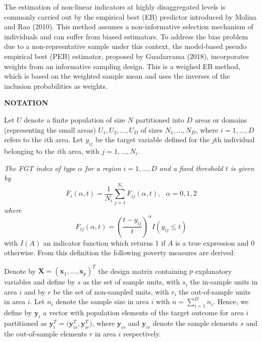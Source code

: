\documentclass[a4paper, 11pt]{article}
\begin{document}
The estimation of non-linear indicators at highly disaggregated levels is commonly carried out by the empirical best (EB) predictor introduced by Molina and Rao (2010). This method assumes a non-informative selection mechanism of individuals and can suffer from biased estimators. To address the bias problem due to a non-represntative sample under this context, the model-based pseudo empirical best (PEB) estimator, proposed by Guadarrama (2018), incorporates weights from an informative sampling design. This is a weighed EB method, which is based on the weighted sample mean and uses the inverses of the inclusion probabilities as weights.  

\textbf{NOTATION}

Let $U$ denote a finite population of size $N$ partitioned into $D$ areas or domains (representing the small areas) $U_1,U_2,\ldots,U_D$ of sizes $N_1,\ldots, N_D$, where $i=1,\ldots,D$ refers to the $i$th area. Let $y_{ij}$ be the target variable defined for the $j$th individual belonging to the $i$th area, with $j=1,\ldots,N_i$.



\textit{The FGT index of type $\alpha$ for a region $i=1,\ldots,D$ and a fixed threshold $t$ is given by}
\begin{equation}\label{eq:FGT}
F_{i}(\alpha,t)=\frac{1}{N_i}\sum_{j=1}^{N_i} F_{ij}(\alpha,t), \,\,\,\, \alpha=0,1,2
\end{equation}
\textit{where}
\begin{equation*}
F_{ij}(\alpha,t)= \left( \frac{t-y_{ij} }{t} \right)^\alpha I (y_{ij} \leq t)
\end{equation*}
with $I(A)$ an indicator function which returns 1 if $A$ is a true expression and 0 otherwise. From this definition the following poverty measures are derived:



 Denote by $\mathbf{X}=(\mathbf{x}_1,\ldots,\mathbf{x}_p)^{T}$ the design matrix containing $p$ explanatory variables and define by $s$ as the set of sample units, with $s_i$ the in-sample units in area $i$ and by $r$ be the set of non-sampled units, with $r_i$ the out-of-sample units in area $i$. Let $n_i$ denote the sample size in area $i$ with $n=\sum_{i=1}^{D}n_i$. Hence, we define by $\mathbf{y}_{i}$ a vector with population elements of the target outcome for area $i$ partitioned as $\mathbf{y}_i^T= \Big(\mathbf{y}_{is}^T,\mathbf{y}_{ir}^T\Big) $, where $\mathbf{y}_{is}$ and $\mathbf{y}_{ir}$ denote the sample elements $s$ and the out-of-sample elements $r$ in area $i$ respectively.
\end{document}
